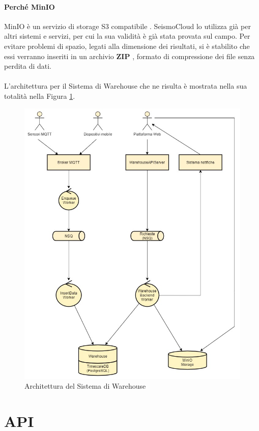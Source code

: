 \paragraph{Perché MinIO} MinIO è un servizio di storage S3 compatibile \cite{miniourl}. SeismoCloud lo utilizza già per altri sistemi e servizi, per cui la sua validità è già stata provata sul campo. Per evitare problemi di spazio, legati alla dimensione dei risultati, si è stabilito che essi verranno inseriti in un archivio \textbf{ZIP} \cite{zip}, formato di compressione dei file senza perdita di dati.\\ \\ 
L'architettura per il Sistema di Warehouse che ne risulta è mostrata nella sua totalità nella Figura \ref{fig:warehousearch}.
\begin{figure}
    \includegraphics[left, scale=0.63]{images/warehousearch.jpg}
    \caption{Architettura del Sistema di Warehouse}
    \label{fig:warehousearch}
\end{figure}

\clearpage
\section{API}

